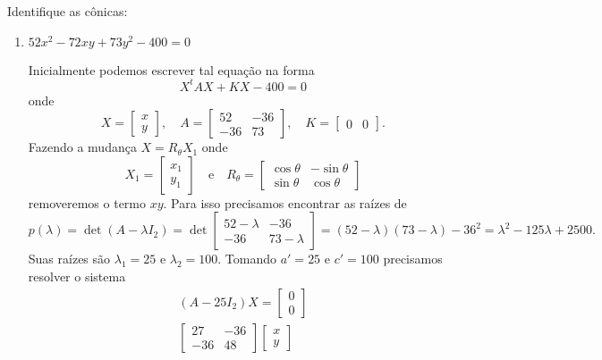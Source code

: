\begin{exemplos}
  Identifique as cônicas:
  \begin{enumerate}
    \item $52x^2 - 72xy + 73y^2 - 400 = 0$
    \begin{solucao}
      Inicialmente podemos escrever tal equação na forma
      \[
        X^t A X + KX - 400 = 0
      \]
      onde
      \[
        X = \begin{bmatrix}
          x\\y
        \end{bmatrix}, \quad A = \begin{bmatrix}
          52 & -36\\
          -36 & 73
        \end{bmatrix},\quad K = \begin{bmatrix}
          0 & 0
        \end{bmatrix}.
      \]
      Fazendo a mudança $X = R_\theta X_1$ onde
      \[
        X_1 = \begin{bmatrix}
          x_1 \\y_1
        \end{bmatrix} \quad\mbox{e}\quad R_\theta = \begin{bmatrix}
          \cos\theta & -\sin\theta\\
          \sin\theta & \cos\theta
        \end{bmatrix}
      \]
      removeremos o termo $xy$. Para isso precisamos encontrar as raízes de
      \[
        p(\lambda) = \det (A - \lambda I_2) = \det \begin{bmatrix}
          52 - \lambda & -36\\
          -36 & 73 - \lambda
        \end{bmatrix} = (52 - \lambda)(73 - \lambda) - 36^2 = \lambda^2 - 125\lambda + 2500.
      \]
      Suas raízes são $\lambda_1 = 25$ e $\lambda_2 = 100$. Tomando $a' = 25$ e $c' = 100$ precisamos resolver o sistema
      \begin{align*}
        (A - 25I_2)X = \begin{bmatrix}
          0\\0
        \end{bmatrix}\\
        \begin{bmatrix}
          27 & -36\\
          -36 & 48
        \end{bmatrix} \begin{bmatrix}
          x \\y

\end{bmatrix}
\end{align*}
\end{solucao}
\end{enumerate}
\end{exemplos}
